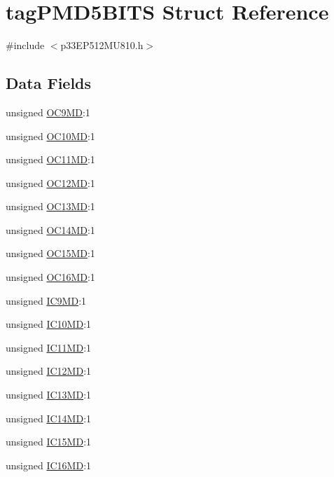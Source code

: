 \hypertarget{structtag_p_m_d5_b_i_t_s}{}\section{tag\+P\+M\+D5\+B\+I\+TS Struct Reference}
\label{structtag_p_m_d5_b_i_t_s}


{\ttfamily \#include $<$p33\+E\+P512\+M\+U810.\+h$>$}

\subsection*{Data Fields}
\begin{DoxyCompactItemize}
\item 
unsigned \hyperlink{structtag_p_m_d5_b_i_t_s_a7461ca8b7aab2ade615a67122dc1edbe}{O\+C9\+MD}\+:1
\item 
unsigned \hyperlink{structtag_p_m_d5_b_i_t_s_a43d2dcc5b40b2786e08b180da04f4d1d}{O\+C10\+MD}\+:1
\item 
unsigned \hyperlink{structtag_p_m_d5_b_i_t_s_a080f0e5e82c981565f4b768b730a5294}{O\+C11\+MD}\+:1
\item 
unsigned \hyperlink{structtag_p_m_d5_b_i_t_s_aff8e259cbffba15d1eb1c1f697479773}{O\+C12\+MD}\+:1
\item 
unsigned \hyperlink{structtag_p_m_d5_b_i_t_s_a026482aa0b85e41c74f3be313d8fff91}{O\+C13\+MD}\+:1
\item 
unsigned \hyperlink{structtag_p_m_d5_b_i_t_s_a67e555ec01f2e86d0f11f196c515378c}{O\+C14\+MD}\+:1
\item 
unsigned \hyperlink{structtag_p_m_d5_b_i_t_s_ab01e448ab08bd7a29ed37d0fda85b099}{O\+C15\+MD}\+:1
\item 
unsigned \hyperlink{structtag_p_m_d5_b_i_t_s_ad46d9cd84af470aec18149f9817b2472}{O\+C16\+MD}\+:1
\item 
unsigned \hyperlink{structtag_p_m_d5_b_i_t_s_adfebff82f6b9159f5c5cddafa7d960a2}{I\+C9\+MD}\+:1
\item 
unsigned \hyperlink{structtag_p_m_d5_b_i_t_s_a2f70541422e170b4a571238696002722}{I\+C10\+MD}\+:1
\item 
unsigned \hyperlink{structtag_p_m_d5_b_i_t_s_a3796fe156714d1add65f47880910badd}{I\+C11\+MD}\+:1
\item 
unsigned \hyperlink{structtag_p_m_d5_b_i_t_s_a845768abc68a14f9466e047c83b5b3b5}{I\+C12\+MD}\+:1
\item 
unsigned \hyperlink{structtag_p_m_d5_b_i_t_s_a630ad743d6441ed026a0c407c63d4b43}{I\+C13\+MD}\+:1
\item 
unsigned \hyperlink{structtag_p_m_d5_b_i_t_s_a9bfe4798345cfa7981e5c80d1b87b28e}{I\+C14\+MD}\+:1
\item 
unsigned \hyperlink{structtag_p_m_d5_b_i_t_s_ad16503cde73cac5c43e07883aca8b34e}{I\+C15\+MD}\+:1
\item 
unsigned \hyperlink{structtag_p_m_d5_b_i_t_s_aacd983d2fee82ee55b5600b47cc6b847}{I\+C16\+MD}\+:1
\end{DoxyCompactItemize}


